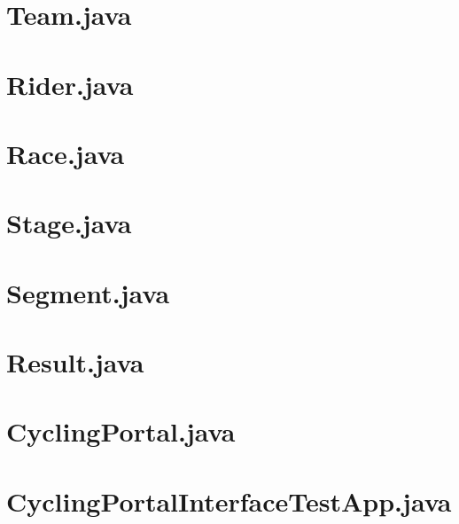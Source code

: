 \documentclass{article}
\begin{document}
\section{Team.java}


\section{Rider.java}


\section{Race.java}


\section{Stage.java}


\section{Segment.java}


\section{Result.java}


\section{CyclingPortal.java}


\section{CyclingPortalInterfaceTestApp.java}

\end{document}
